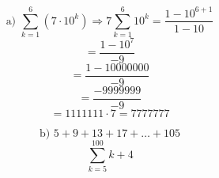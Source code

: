 \documentclass{article}
\begin{document}
\[ \text{a) } \sum_{k=1}^{6} (7 \cdot 10^k) \Rightarrow 7 \sum_{k=1}^{6} 10^k = \frac{1 - 10^{6+1}}{1 - 10} \]
\[ = \frac{1 - 10^7}{-9} \]
\[ = \frac{1 - 10000000}{-9} \]
\[ = \frac{-9999999}{-9} \]
\[ = 1111111 \cdot 7 = 7777777\]

\[ \text{b) } 5 + 9 + 13 + 17 + \dots + 105 \]
\[ \sum_{k=5}^{100} k + 4 \]
\end{document}
